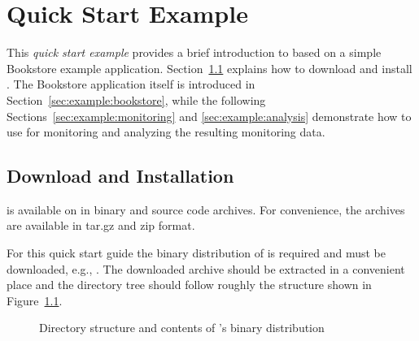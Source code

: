 % 


\chapter{Quick Start Example}\label{chap:example}

This \emph{quick start example} provides a brief introduction to \Kieker{} based on a simple Bookstore example application. Section~\ref{sec:example:downloadInstall} explains how to download and install \Kieker{}. The Bookstore application itself is introduced in Section~\ref{sec:example:bookstore}, while the following Sections~\ref{sec:example:monitoring} and \ref{sec:example:analysis} demonstrate how to use \Kieker{} for monitoring and analyzing the resulting monitoring data.

\section{Download and Installation}\label{sec:example:downloadInstall}

\Kieker{} is available on \KiekerURL{} in binary and source code archives. For convenience, the archives are available in tar.gz and zip format.

For this quick start guide the binary distribution of \Kieker{} is required and must be downloaded, e.g., \file{\binaryFileForDownload}. The downloaded archive should be extracted in a convenient place and the directory tree should follow roughly the structure shown in Figure~\ref{fig:binary-layout}.

\begin{figure}[H]
\begin{graybox}
\end{graybox}
\caption{Directory structure and contents of \Kieker{}'s binary distribution}
\label{fig:binary-layout}
\end{figure}

